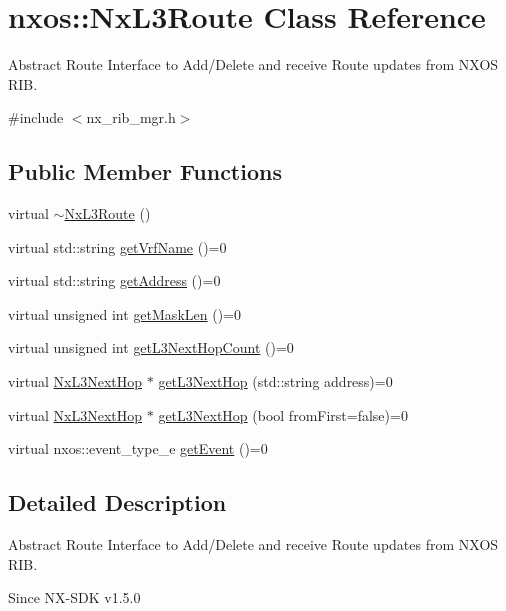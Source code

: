 \hypertarget{classnxos_1_1NxL3Route}{
\section{nxos::NxL3Route Class Reference}
\label{classnxos_1_1NxL3Route}
}


Abstract Route Interface to Add/Delete and receive Route updates from NXOS RIB.  


{\ttfamily \#include $<$nx\_\-rib\_\-mgr.h$>$}\subsection*{Public Member Functions}
\begin{DoxyCompactItemize}
\item 
virtual \hyperlink{classnxos_1_1NxL3Route_abb3762fb6629ba1900e877555cbb69dc}{$\sim$NxL3Route} ()
\item 
virtual std::string \hyperlink{classnxos_1_1NxL3Route_a06ed660337e8b919dd801267957497d7}{getVrfName} ()=0
\item 
virtual std::string \hyperlink{classnxos_1_1NxL3Route_a3176245539589bf745ce1d196975b3c9}{getAddress} ()=0
\item 
virtual unsigned int \hyperlink{classnxos_1_1NxL3Route_aaafa1d34e62297bbed574995ff48dba9}{getMaskLen} ()=0
\item 
virtual unsigned int \hyperlink{classnxos_1_1NxL3Route_a5e402096d7ff280b6f4d334b3bd954d4}{getL3NextHopCount} ()=0
\item 
virtual \hyperlink{classnxos_1_1NxL3NextHop}{NxL3NextHop} $\ast$ \hyperlink{classnxos_1_1NxL3Route_a960a2e429fd7514f0d40e64743e04872}{getL3NextHop} (std::string address)=0
\item 
virtual \hyperlink{classnxos_1_1NxL3NextHop}{NxL3NextHop} $\ast$ \hyperlink{classnxos_1_1NxL3Route_a7877c5328b1706acbbe5d8dbc6c94f4e}{getL3NextHop} (bool fromFirst=false)=0
\item 
virtual nxos::event\_\-type\_\-e \hyperlink{classnxos_1_1NxL3Route_a9ca0b236a35cc616753e09e620b6b02f}{getEvent} ()=0
\end{DoxyCompactItemize}


\subsection{Detailed Description}
Abstract Route Interface to Add/Delete and receive Route updates from NXOS RIB. \begin{DoxySince}{Since}
NX-\/SDK v1.5.0 
\end{DoxySince}


